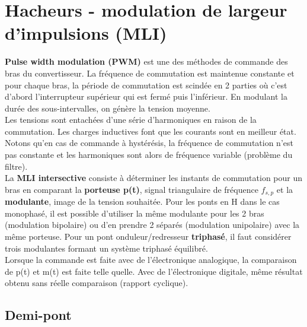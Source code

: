 \section{Hacheurs - modulation de largeur d'impulsions (MLI)}
	 \textbf{Pulse width modulation (PWM)} est une des méthodes de commande des bras du convertisseur. La fréquence de commutation est maintenue constante et pour chaque bras, la période de commutation est scindée en 2 parties où c'est d'abord l'interrupteur supérieur qui est fermé puis l'inférieur. En modulant la durée des sous-intervalles, on génère la tension moyenne. \\
	 
	 Les tensions sont entachées d'une série d'harmoniques en raison de la commutation. Les charges inductives font que les courants sont en meilleur état. Notons qu'en cas de commande à hystérésis, la fréquence de commutation n'est pas constante et les harmoniques sont alors de fréquence variable (problème du filtre). \\
	 La \textbf{MLI intersective} consiste à déterminer les instants de commutation pour un bras en comparant la \textbf{porteuse p(t)}, signal triangulaire de fréquence $f_{s,p}$ et la \textbf{modulante}, image de la tension souhaitée. Pour les ponts en H dans le cas monophasé, il est possible d'utiliser la même modulante pour les 2 bras (modulation bipolaire) ou d'en prendre 2 séparés (modulation unipolaire) avec la même porteuse. Pour un pont onduleur/redresseur \textbf{triphasé}, il faut considérer trois modulantes formant un système triphasé équilibré. \\
	 
	 Lorsque la commande est faite avec de l'électronique analogique, la comparaison de p(t) et m(t) est faite telle quelle. Avec de l'électronique digitale, même résultat obtenu sans réelle comparaison (rapport cyclique). 
	 
	 \subsection{Demi-pont}
